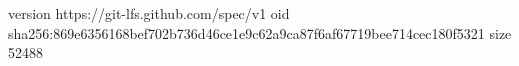 version https://git-lfs.github.com/spec/v1
oid sha256:869e6356168bef702b736d46ce1e9c62a9ca87f6af67719bee714cec180f5321
size 52488
